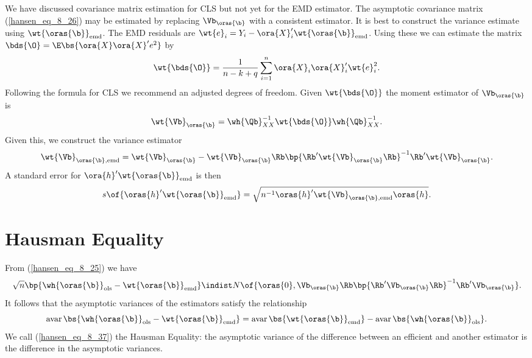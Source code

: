 We have discussed covariance matrix estimation for CLS but not yet for the EMD estimator. The asymptotic covariance matrix (\ref{hansen_eq_8_26}) may be estimated by replacing $\Vb_{\oras{\b}}$ with a consistent estimator. It is best to construct the variance estimate using $\wt{\oras{\b}}_{\text{emd}}$. The EMD residuals are $\wt{e}_i = Y_i - \ora{X}_i^{\prime} \wt{\oras{\b}}_{\text{emd}}$. Using these we can estimate the matrix $\bds{\O} = \E\bs{\ora{X}\ora{X}^{\prime} e^2}$ by 
\begin{equation}
    \notag 
    \wt{\bds{\O}} = \frac{1}{n-k+q} \sum_{i=1}^{n} \ora{X}_i \ora{X}_i^{\prime} \wt{e}_i^2.
\end{equation}
Following the formula for CLS we recommend an adjusted degrees of freedom. Given $\wt{\bds{\O}}$ the moment estimator of $\Vb_{\oras{\b}}$ is 
\begin{equation}
    \notag 
    \wt{\Vb}_{\oras{\b}} = \wh{\Qb}_{XX}^{-1} \wt{\bds{\O}} \wh{\Qb}_{XX}^{-1}.
\end{equation}
Given this, we construct the variance estimator 
\begin{equation}
    \label{hansen_eq_8_35}
    \wt{\Vb}_{\oras{\b}, \text{emd}} = \wt{\Vb}_{\oras{\b}} - \wt{\Vb}_{\oras{\b}} \Rb \bp{\Rb^{\prime} \wt{\Vb}_{\oras{\b}} \Rb}^{-1} \Rb^{\prime} \wt{\Vb}_{\oras{\b}}.
\end{equation}
A standard error for $\ora{h}^{\prime}\wt{\oras{\b}}_{\text{emd}}$ is then 
\begin{equation}
    \label{hansen_eq_8_36}
    s\of{\oras{h}^{\prime} \wt{\oras{\b}}_{\text{emd}}} = \sqrt{n^{-1} \oras{h}^{\prime} \wt{\Vb}_{\oras{\b}, \text{emd}} \oras{h}}.
\end{equation}

\section{Hausman Equality}

From (\ref{hansen_eq_8_25}) we have 
\begin{equation}
    \notag 
    \sqrt{n}\bp{\wh{\oras{\b}}_{\text{ols}} - \wt{\oras{\b}}_{\text{emd}}} \indist N\of{\oras{0}, \Vb_{\oras{\b}} \Rb \bp{\Rb^{\prime} \Vb_{\oras{\b}} \Rb}^{-1} \Rb^{\prime} \Vb_{\oras{\b}}}.
\end{equation}
It follows that the asymptotic variances of the estimators satisfy the relationship
\begin{equation}
    \label{hansen_eq_8_37}
    \operatorname{avar}\bs{\wh{\oras{\b}}_{\text{ols}} - \wt{\oras{\b}}_{\text{emd}}} = \operatorname{avar}\bs{\wt{\oras{\b}}_{\text{emd}}} - \operatorname{avar}\bs{\wh{\oras{\b}}_{\text{ols}}}.
\end{equation}
We call (\ref{hansen_eq_8_37}) the Hausman Equality: the asymptotic variance of the difference between an efficient and another estimator is the difference in the asymptotic variances.
